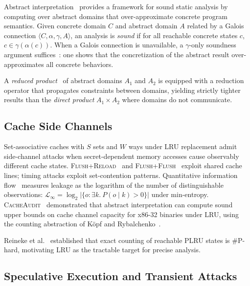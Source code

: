 \documentclass{article}
\theoremstyle{definition}
\theoremstyle{remark}
\begin{document}
Abstract interpretation~\cite{cousot1977abstract} provides a framework for
sound static analysis by computing over abstract domains that
over-approximate concrete program semantics.  Given concrete domain $C$ and
abstract domain $A$ related by a Galois connection
$\langle C, \alpha, \gamma, A \rangle$, an analysis is \emph{sound} if for all
reachable concrete states $c$, $c \in \gamma(\alpha(c))$.  When a Galois
connection is unavailable, a $\gamma$-only soundness argument
suffices~\cite{cousot1992abstract}: one shows that the concretization of the
abstract result over-approximates all concrete behaviors.

A \emph{reduced product}~\cite{cousot1979systematic,granger1992improving} of
abstract domains $A_1$ and $A_2$ is equipped with a reduction operator that
propagates constraints between domains, yielding strictly tighter results than
the \emph{direct product} $A_1 \times A_2$ where domains do not communicate.

\subsection{Cache Side Channels}
\label{sec:bg-cache}

Set-associative caches with $S$ sets and $W$ ways under LRU replacement admit
side-channel attacks when secret-dependent memory accesses cause
observably different cache states.  \textsc{Flush+Reload}~\cite{yarom2014flush}
and \textsc{Flush+Flush}~\cite{gruss2016flush} exploit shared cache lines;
timing attacks exploit set-contention patterns.  Quantitative information
flow~\cite{smith2009foundations,kopf2010approximation} measures leakage as the
logarithm of the number of distinguishable observations:
$\mathcal{L}_\infty = \log_2 |\{o : \exists k.\ P(o \mid k) > 0\}|$ under
min-entropy.  \textsc{CacheAudit}~\cite{doychev2015cacheaudit} demonstrated
that abstract interpretation can compute sound upper bounds on cache channel
capacity for x86-32 binaries under LRU, using the counting
abstraction of K\"opf and Rybalchenko~\cite{kopf2010approximation}.

Reineke et al.~\cite{reineke2007timing} established that exact counting of
reachable PLRU states is \#P-hard, motivating LRU as the tractable target for
precise analysis.

\subsection{Speculative Execution and Transient Attacks}
\label{sec:bg-spec}
\end{document}
